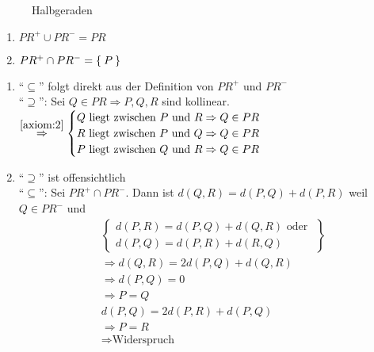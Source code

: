 \begin{figure}[htp]
    \centering
    
    \caption{Halbgeraden}
    \label{fig:halbgeraden}
\end{figure}

\begin{bemerkung}
    \begin{enumerate}[label=(\roman*)]
        \item $PR^+ \cup PR^- = PR$
        \item $PR^+ \cap PR^- = \Set{P}$
    \end{enumerate}
\end{bemerkung}

\begin{beweis}\leavevmode
    \begin{enumerate}[label=(\roman*)]
        \item \enquote{$\subseteq$} folgt direkt aus der Definition von $PR^+$ und $PR^-$\\
              \enquote{$\supseteq$}: Sei $Q \in PR \Rightarrow P, Q, R$ 
              sind kollinear.\\
              $\overset{\ref{axiom:2}}{\Rightarrow}
              \begin{cases} 
                Q \text{ liegt zwischen } P \text{ und } R \Rightarrow Q \in PR\\
                R \text{ liegt zwischen } P \text{ und } Q \Rightarrow Q \in PR\\
                P \text{ liegt zwischen } Q \text{ und } R \Rightarrow Q \in PR
              \end{cases}$
        \item \enquote{$\supseteq$} ist offensichtlich\\
              \enquote{$\subseteq$}: Sei $PR^+ \cap PR^-$. Dann ist
              $d(Q,R) = d(P,Q) + d(P,R)$ weil $Q \in PR^-$ und
              \begin{align*}
                &\left \{ \begin{array}{l}
                        d(P,R) = d(P,Q) + d(Q,R) \text{ oder }\\
                        d(P,Q) = d(P,R) + d(R,Q)
                       \end{array} \right \}\\
                &\Rightarrow d(Q,R) = 2d(P,Q) + d(Q,R)\\
                &\Rightarrow d(P,Q) = 0\\
                &\Rightarrow P=Q\\
                &d(P,Q) = 2d(P,R) + d(P,Q)\\
                &\Rightarrow P=R\\
                &\Rightarrow \text{Widerspruch}
              \end{align*}
    \end{enumerate}
\end{beweis}

